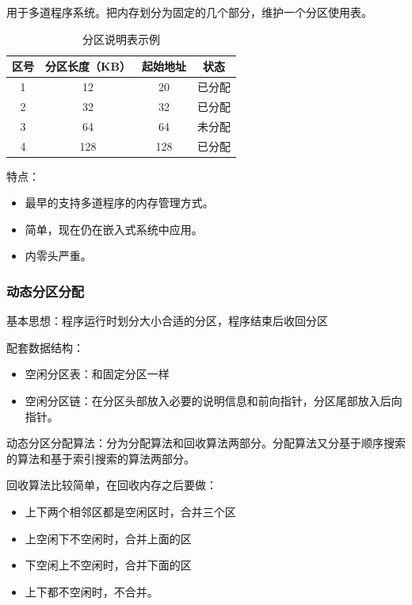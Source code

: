 \documentclass[12pt, a4paper, oneside]{ctexart}
\begin{document}
用于多道程序系统。把内存划分为固定的几个部分，维护一个分区使用表。

\begin{table}[!ht]
    \centering
    \caption{分区说明表示例}
    \begin{tabular}{|c|c|c|c|}
    \hline
        \textbf{区号} & \textbf{分区长度（KB）} & \textbf{起始地址} & \textbf{状态} \\ \hline
        1 & 12 & 20 & 已分配 \\ \hline
        2 & 32 & 32 & 已分配 \\ \hline
        3 & 64 & 64 & 未分配 \\ \hline
        4 & 128 & 128 & 已分配 \\ \hline
    \end{tabular}
\end{table}

特点：
\begin{itemize}
    \item 最早的支持多道程序的内存管理方式。
    \item 简单，现在仍在嵌入式系统中应用。
    \item 内零头严重。
\end{itemize}

\subsubsection{动态分区分配}

基本思想：程序运行时划分大小合适的分区，程序结束后收回分区

配套数据结构：
\begin{itemize}
    \item 空闲分区表：和固定分区一样
    \item 空闲分区链：在分区头部放入必要的说明信息和前向指针，分区尾部放入后向指针。
\end{itemize}

动态分区分配算法：分为分配算法和回收算法两部分。分配算法又分基于顺序搜索的算法和基于索引搜索的算法两部分。

回收算法比较简单，在回收内存之后要做：
\begin{itemize}
    \item 上下两个相邻区都是空闲区时，合并三个区
    \item 上空闲下不空闲时，合并上面的区
    \item 下空闲上不空闲时，合并下面的区
    \item 上下都不空闲时，不合并。
\end{itemize}
\end{document}

